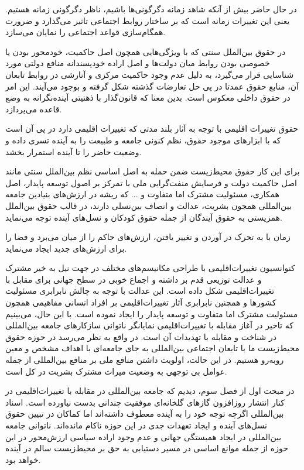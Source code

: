  در حال حاضر بیش از آنکه شاهد زمانه دگرگونی‌ها باشیم، ناظر دگرگونی زمانه هستیم. یعنی این تغییرات زمانه است که بر ساختار روابط اجتماعی تاثیر می‌گذارد و ضرورت همگام‌سازی قواعد اجتماعی را نمایان می‌سازد. 
 
 در حقوق بین‌الملل سنتی که با ویژگی‌هایی همچون اصل حاکمیت، خود‌محور بودن یا خصوصی بودن روابط میان دولت‌ها و اصل اراده خود‌پسندانه منافع دولتی مورد شناسایی قرار می‌گیرد، به دلیل عدم وجود حاکمیت مرکزی و آنارشی در روابط تابعان آن، منابع حقوق عمدتا در پی حل تعارضات گذشته شکل گرفته و بوجود می‌آیند. این امر در حقوق داخلی معکوس است. بدین معنا که قانون‌گذار با ذهنیتی آینده‌نگرانه به وضع قاعده می‌پردازد.
 
 
 حقوق تغییرات اقلیمی با توجه به آثار بلند مدتی که تغییرات اقلیمی دارد در پی آن است که با ابزار‌های موجود حقوق، نظم کنونی جامعه و طبیعت را به آینده تسری داده و وضعیت حاضر را تا آینده استمرار بخشد. 
 
 برای این کار حقوق محیط‌زیست ضمن حمله به اصل اساسی نظم بین‌الملل سنتی مانند اصل حاکمیت دولت و فرسایش منفت‌گرایی ملی با تمرکز بر اصول توسعه پایدار، اصل همکاری، مسئولیت مشترک اما متفاوت و ... که ریشه در ارزش‌های بنیادین جامعه بین‌المللی همجون بشریت، عدالت و انصاف بین‌نسلی دارند، در قالب حقوق بین‌الملل همزیستی به حقوق آیندگان از جمله حقوق کودکان و نسل‌های آینده توجه می‌نماید. 
 
 زمان با به تحرک در آوردن و تغییر یافتن، ارزش‌های حاکم را از میان می‌برد و فضا را برای ارزش‌های جدید ایجاد می‌نماید. 
 
 
 
کنوانسیون تغییرات‌اقلیمی با طراحی مکانیسم‌های مختلف در جهت نیل به خیر مشترک و عدالت توزیعی قدم بر داشته و اجماع خوبی در سطح جهانی برای مقابل با تغییرات‌اقلیمی شکل داده است. این عدالت با توجه به چالش نابرابری مسئولیت کشور‌ها و همچنین نابرابری آثار تغییرات‌اقلیمی بر افراد انسانی مفاهیمی همچون مسئولیت مشترک اما متفاوت و توسعه پایدار را ایجاد نموده است. با این حال، می‌بینیم که تاخیر در آغاز مقابله با تغییرات‌اقلیمی نمایانگر ناتوانی سازکار‌های جامعه بین‌المللی در شناخت و مقابله با تهدیدات آن است. در واقع به نظر می‌رسد در حوزه حقوق محیط‌زیست ما با تابعان اجتماعی بین‌المللی به جای جامعه‌ای با اهداف مشخص و معین روبه‌رو هستیم. در این حالت، اولویت داشتن منافع ملی بر منافع بین‌المللی از جمله عوامل بی توجهی به وضعیت میراث مشترک بشریت در کل است. 
 
در مبحث اول از فصل سوم، دیدیم که جامعه بین‌المللی در مقابله با تغییرات‌اقلیمی در کنار انتشار روزافزون گاز‌های‌ گلخانه‌ای موفقیت چندانی بدست نیاورده است. اسناد بین‌المللی اگرچه توجه خود را به آینده معطوف داشته‌اند اما کماکان در تبیین حقوق نسل‌های آینده و ایجاد تعهدات جدی در این حوزه ناکام مانده‌اند. ناتوانی جامعه بین‌المللی در ایجاد همبستگی جهانی و عدم وجود اراده سیاسی ارزش‌محور در این حوزه از جمله موانع اساسی در مسیر دستیابی به حق بر محیط‌زیست سالم در آینده خواهد بود. 
 
